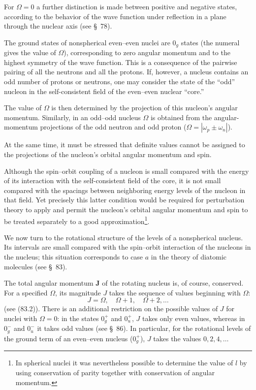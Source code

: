 For $\Omega=0$ a further distinction is made between positive and negative
states, according to the behavior of the wave function under reflection in a
plane through the nuclear axis (see \S~78).

The ground states of nonspherical even--even nuclei are $0_g$ states (the
numeral gives the value of $\Omega$), corresponding to zero angular momentum
and to the highest symmetry of the wave function. This is a consequence of the
pairwise pairing of all the neutrons and all the protons. If, however, a
nucleus contains an odd number of protons or neutrons, one may consider the
state of the ``odd'' nucleon in the self-consistent field of the even--even
nuclear ``core.''

The value of $\Omega$ is then determined by the projection of this nucleon's
angular momentum. Similarly, in an odd--odd nucleus $\Omega$ is obtained from
the angular-momentum projections of the odd neutron and odd
proton ($\Omega=|\omega_p\pm\omega_n|$).

At the same time, it must be stressed that definite values cannot be assigned
to the projections of the nucleon's orbital angular momentum and spin.

Although the spin--orbit coupling of a nucleon is small compared with the
energy of its interaction with the self-consistent field of the core, it is
not small compared with the spacings between neighboring energy levels of the
nucleon in that field. Yet precisely this latter condition would be required
for perturbation theory to apply and permit the nucleon's orbital angular
momentum and spin to be treated separately to a good approximation\footnote{In
spherical nuclei it was nevertheless possible to determine the value of $l$
by using conservation of parity together with conservation of angular
momentum.}.

We now turn to the rotational structure of the levels of a nonspherical
nucleus. Its intervals are small compared with the spin--orbit interaction of
the nucleons in the nucleus; this situation corresponds to case $a$ in the
theory of diatomic molecules (see \S~83).

The total angular momentum $\mathbf J$ of the rotating nucleus is, of course,
conserved. For a specified $\Omega$, its magnitude $J$ takes the sequence of
values beginning with $\Omega$:
\begin{equation}
 J=\Omega,\quad \Omega+1,\quad \Omega+2,\ldots
 \tag{119.1}
\end{equation}
(see (83.2)). There is an additional restriction on the possible values of
$J$ for nuclei with $\Omega=0$: in the states $0_g^+$ and $0_u^+$, $J$ takes
only even values, whereas in $0_g^-$ and $0_u^-$ it takes odd values (see
\S~86). In particular, for the rotational levels of the ground term of an
even--even nucleus ($0_g^+$), $J$ takes the values $0,2,4,\ldots$

